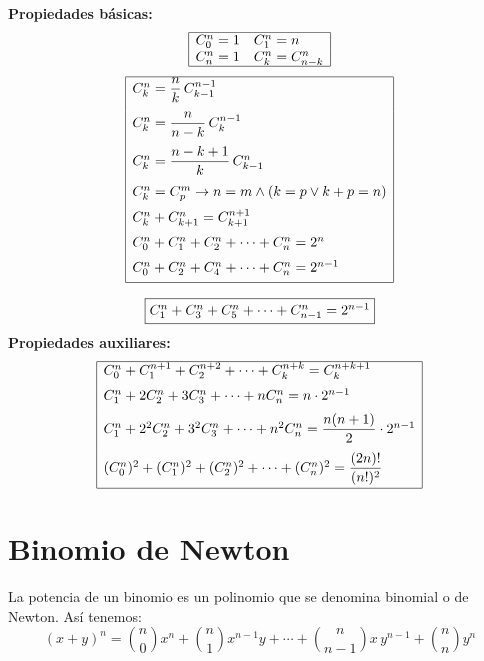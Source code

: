 \documentclass[11pt,a4paper]{article}
\begin{document}
\begin{minipage}[t]{0.466\textwidth}
\textbf{Propiedades básicas:}
\[
\begin{array}{|ll|}
\hline
C^{n}_{0} = 1 & C^{n}_{1} = n\\
C^{n}_{n} = 1 & C^{n}_{k} = C^{n}_{n-k}\\ \hline
\end{array}
\]
\[
\begin{array}{|l|}
\hline
C^{n}_{k} = \dfrac{n}{k}\,C^{n-1}_{k-1}\\[10pt]
C^{n}_{k} = \dfrac{n}{n-k}\,C^{n-1}_{k}\\[10pt]
C^{n}_{k} = \dfrac{n-k+1}{k}\,C^{n}_{k-1}\\[10pt]
C^{n}_{k} = C^{m}_{p} \rightarrow n = m \wedge (k = p \vee k + p = n)\\[6pt]
C^{n}_{k} + C^{n}_{k+1} = C^{n+1}_{k+1}\\[6pt]
C^{n}_{0} + C^{n}_{1} + C^{n}_{2} + \cdots + C^{n}_{n} = 2^n\\[6pt]
C^{n}_{0} + C^{n}_{2} + C^{n}_{4} + \cdots + C^{n}_{n} = 2^{n-1}\\[4pt] \hline
\end{array}
\]
\end{minipage}\hfill
\begin{minipage}[t]{0.504\textwidth}
\[
\fbox{$C^{n}_{1} + C^{n}_{3} + C^{n}_{5} + \cdots + C^{n}_{n-1} = 2^{n-1}$}
\]
\textbf{Propiedades auxiliares:}
\[
\begin{array}{|l|}
\hline
C^{n}_{0} + C^{n+1}_{1} + C^{n+2}_{2} + \cdots + C^{n+k}_{k} = C^{n+k+1}_{k}\\[6pt]
C^{n}_{1} + 2C^{n}_{2} + 3C^{n}_{3} + \cdots + nC^{n}_{n} = n\cdot 2^{n-1}\\[6pt]
C^{n}_{1} + 2^2C^{n}_{2} + 3^2C^{n}_{3} + \cdots + n^2C^{n}_{n} = \dfrac{n(n+1)}{2}\cdot 2^{n-1}\\[10pt]
(C^{n}_{0})^2 + (C^{n}_{1})^2 + (C^{n}_{2})^2 + \cdots + (C^{n}_{n})^2 = \dfrac{(2n)!}{(n!)^2}\\[8pt] \hline
\end{array}
\]
\end{minipage}

\newpage
\section{Binomio de Newton}

La potencia de un binomio es un polinomio que se denomina binomial o de Newton.
Así tenemos:
\[(x+y)^n = \binom{n}{0}x^n + \binom{n}{1}x^{n-1}y + \cdots + \binom{n}{n-1}x\,y^{n-1} + \binom{n}{n}y^n\]
\end{document}
